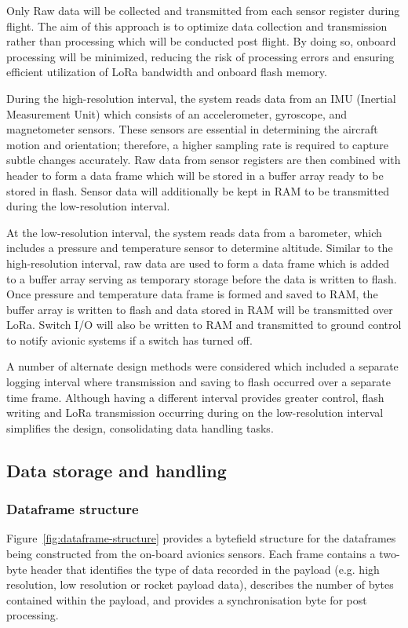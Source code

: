 Only Raw data will be collected and transmitted from each sensor register during flight. The aim of this approach is to optimize data collection and transmission rather than processing which will be conducted post flight. By doing so, onboard processing will be minimized, reducing the risk of processing errors and ensuring efficient utilization of LoRa bandwidth and onboard flash memory. 

During the high-resolution interval, the system reads data from an IMU (Inertial Measurement Unit) which consists of an accelerometer, gyroscope, and magnetometer sensors. These sensors are essential in determining the aircraft motion and orientation; therefore, a higher sampling rate is required to capture subtle changes accurately. Raw data from sensor registers are then combined with header to form a data frame which will be stored in a buffer array ready to be stored in flash. Sensor data will additionally be kept in RAM to be transmitted during the low-resolution interval.  

At the low-resolution interval, the system reads data from a barometer, which includes a pressure and temperature sensor to determine altitude. Similar to the high-resolution interval, raw data are used to form a data frame which is added to a buffer array serving as temporary storage before the data is written to flash. Once pressure and temperature data frame is formed and saved to RAM, the buffer array is written to flash and data stored in RAM will be transmitted over LoRa. Switch I/O will also be written to RAM and transmitted to ground control to notify avionic systems if a switch has turned off.  

A number of alternate design methods were considered which included a separate logging interval where transmission and saving to flash occurred over a separate time frame. Although having a different interval provides greater control, flash writing and LoRa transmission occurring during on the low-resolution interval simplifies the design, consolidating data handling tasks.  

\subsection{Data storage and handling}
\subsubsection{Dataframe structure}\label{sec:dataframe-structure}
Figure~\ref{fig:dataframe-structure} provides a bytefield structure for the dataframes being constructed from the on-board avionics sensors. Each frame contains a two-byte header that identifies the type of data recorded in the payload (e.g. high resolution, low resolution or rocket payload data), describes the number of bytes contained within the payload, and provides a synchronisation byte for post processing.\\[0.5em]

